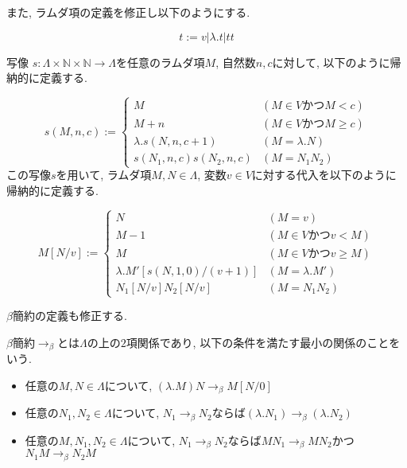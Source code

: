 \documentclass{ltjsarticle}
\begin{document}
また, ラムダ項の定義を修正し以下のようにする.

\begin{defn}
 \[
 t := v | \lambda. t | t t
 \]
\end{defn}

\begin{defn}
 写像 $s \colon \Lambda \times \mathbb{N} \times \mathbb{N} \rightarrow \Lambda$を任意のラムダ項$M$, 自然数$n, c$に対して, 以下のように帰納的に定義する.
 
\[
  s (M, n, c) := \begin{cases}
    M & (M \in V \text{かつ} M < c) \\
    M + n & (M \in V \text{かつ} M \geq c) \\
    \lambda. s (N, n, c + 1) & (M = \lambda. N) \\
    s (N_1, n, c) s (N_2, n, c) & (M = N_1 N_2)
  \end{cases}
\]
 この写像$s$を用いて, ラムダ項$M, N \in \Lambda$, 変数$v \in V$に対する代入を以下のように帰納的に定義する.
 
\[
 M[N/v] := \begin{cases}
    N & (M = v) \\
    M - 1 & (M \in V \text{かつ} v < M) \\
    M & (M \in V \text{かつ} v \geq M) \\
    \lambda. M' [s (N, 1, 0)/(v + 1)] & (M = \lambda. M') \\
    N_1[N/v] N_2[N/v] & (M = N_1 N_2)
  \end{cases}
\]
\end{defn}

$\beta$簡約の定義も修正する.

\begin{defn}
 $\beta$簡約$\rightarrow_{\beta}$とは$\Lambda$の上の$2$項関係であり, 以下の条件を満たす最小の関係のことをいう.
 \begin{itemize}
  \item 任意の$M, N \in \Lambda$について, $(\lambda. M) N \rightarrow_\beta M[N/0]$
  \item 任意の$N_1, N_2 \in \Lambda$について, $N_1 \rightarrow_\beta N_2$ならば$(\lambda. N_1) \rightarrow_\beta (\lambda. N_2)$
  \item 任意の$M, N_1, N_2 \in \Lambda$について, $N_1 \rightarrow_\beta N_2$ならば$M N_1 \rightarrow_\beta M N_2$かつ$N_1 M \rightarrow_\beta N_2 M$
 \end{itemize}
\end{defn}
\end{document}
